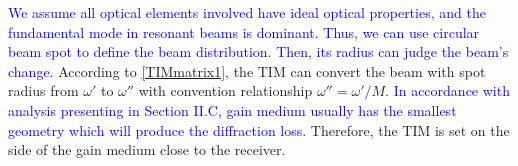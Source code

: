 \documentclass{IEEEtran}
\begin{document}
\textcolor{blue}{We assume all optical elements involved have ideal optical properties, and the fundamental mode in resonant beams is dominant. Thus, we can use circular beam spot to define the beam distribution.
Then, its radius can judge the beam’s change.} 
According to \eqref{TIMmatrix1}, the TIM can convert the beam with spot radius from $\omega'$ to $\omega''$ with convention relationship $\omega''=\omega'/M$. 
\textcolor{blue}{In accordance with analysis presenting in Section II.C, gain medium usually has the smallest geometry which will produce the diffraction loss.} Therefore, the TIM is set on the side of the gain medium close to the receiver.
\end{document}
